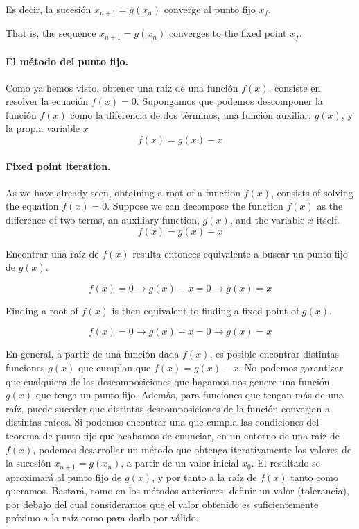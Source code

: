 \begin{paracol}{2}
Es decir, la sucesión  $x_{n+1}=g(x_n)$ converge al punto fijo $x_f$.

\switchcolumn
That is, the sequence $x_{n+1}=g(x_n)$ converges to the fixed point $x_f$.
\switchcolumn
\paragraph{El método del punto fijo.} Como ya hemos visto, obtener una raíz de una función $f(x)$, consiste en resolver la ecuación $f(x)=0$. Supongamos que podemos descomponer la función $f(x)$ como la diferencia de dos términos, una función auxiliar, $g(x)$, y la propia variable $x$
\begin{equation*}
f(x)=g(x)-x
\end{equation*}
\switchcolumn
\paragraph{Fixed point iteration.} As we have already seen, obtaining a root of a function $f(x)$, consists of solving the equation $f(x)=0$. Suppose we can decompose the function $f(x)$ as the difference of two terms, an auxiliary function, $g(x)$, and the variable $x$ itself.
\begin{equation*}
f(x)=g(x)-x
\end{equation*}

\switchcolumn

Encontrar una raíz de $f(x)$ resulta entonces equivalente a buscar un punto fijo de $g(x)$. 

\begin{equation*}
f(x)=0 \rightarrow g(x)-x=0 \rightarrow g(x)=x
\end{equation*}

\switchcolumn


Finding a root of $f(x)$ is then equivalent to finding a fixed point of $g(x)$.

\begin{equation*}
f(x)=0 \rightarrow g(x)-x=0 \rightarrow g(x)=x
\end{equation*}

\switchcolumn

En general, a partir de una función dada $f(x)$, es posible encontrar distintas funciones $g(x)$ que cumplan que $f(x)=g(x)-x$. No podemos garantizar que cualquiera de las descomposiciones que hagamos nos genere una función $g(x)$ que tenga un punto fijo. 
Además, para funciones que tengan más de una raíz, puede suceder que distintas descomposiciones de la función converjan a distintas raíces.
Si podemos encontrar una que cumpla las condiciones del teorema de punto fijo que acabamos de enunciar, en un entorno de una raíz de $f(x)$, podemos desarrollar un método que obtenga iterativamente los valores de la sucesión   $x_{n+1}=g(x_n)$, a partir de un valor inicial $x_0$.  El resultado se aproximará al punto fijo de $g(x)$, y por tanto a la raíz de $f(x)$ tanto como queramos. Bastará, como   en los métodos anteriores, definir un valor (tolerancia), por debajo del cual consideramos que el valor obtenido es suficientemente próximo a  la raíz como para darlo por válido. 


\end{paracol}
